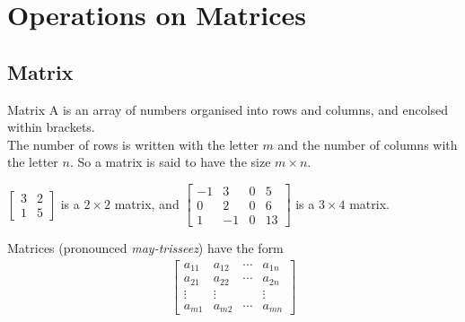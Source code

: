 \documentclass[../notes.tex]{subfiles}
\begin{document}
		\section{Operations on Matrices}
			\subsection{Matrix}
				\begin{definition}{Matrix}
					A  is an array of numbers organised into rows and columns, and encolsed within brackets.\\
					The number of rows is written with the letter $m$ and the number of columns with the letter $n$. So a matrix is said to have the size $m \times n$.
				\end{definition}
				\begin{example}[hbox]
					$\begin{bmatrix}
						3 & 2\\
						1 & 5
					\end{bmatrix}$ is a $2 \times 2$ matrix, and
					$\begin{bmatrix}
						-1 & 3 & 0 & 5\\
						0 & 2 & 0 & 6\\
						1 & - 1& 0 & 13
					\end{bmatrix}$ is a $3 \times 4$ matrix.
				\end{example}
				Matrices (pronounced \emph{may-trisseez}) have the form 
				\begin{align*}
					\begin{bmatrix}
						a_{11} & a_{12} & \cdots & a_{1n}\\
						a_{21} & a_{22} & \cdots & a_{2n}\\
						\vdots & \vdots & & \vdots\\
						a_{m1} & a_{m2} & \cdots & a_{mn}
					\end{bmatrix}
				\end{align*}
\end{document}
